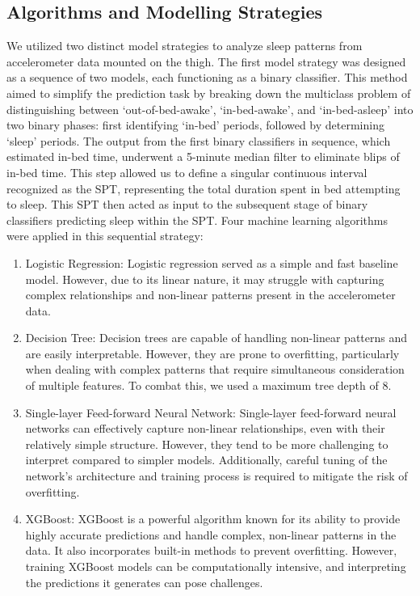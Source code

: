 \documentclass[
  10pt,
]{scrbook}
\begin{document}
\hypertarget{algorithms-and-modelling-strategies}{%
\subsection{Algorithms and Modelling
Strategies}\label{algorithms-and-modelling-strategies}}

We utilized two distinct model strategies to analyze sleep patterns from
accelerometer data mounted on the thigh. The first model strategy was
designed as a sequence of two models, each functioning as a binary
classifier. This method aimed to simplify the prediction task by
breaking down the multiclass problem of distinguishing between
`out-of-bed-awake', `in-bed-awake', and `in-bed-asleep' into two binary
phases: first identifying `in-bed' periods, followed by determining
`sleep' periods. The output from the first binary classifiers in
sequence, which estimated in-bed time, underwent a 5-minute median
filter to eliminate blips of in-bed time. This step allowed us to define
a singular continuous interval recognized as the SPT, representing the
total duration spent in bed attempting to sleep. This SPT then acted as
input to the subsequent stage of binary classifiers predicting sleep
within the SPT. Four machine learning algorithms were applied in this
sequential strategy:

\begin{enumerate}
\def\labelenumi{\arabic{enumi}.}
\item
  Logistic Regression: Logistic regression served as a simple and fast
  baseline model. However, due to its linear nature, it may struggle
  with capturing complex relationships and non-linear patterns present
  in the accelerometer data.
\item
  Decision Tree: Decision trees are capable of handling non-linear
  patterns and are easily interpretable. However, they are prone to
  overfitting, particularly when dealing with complex patterns that
  require simultaneous consideration of multiple features. To combat
  this, we used a maximum tree depth of 8.
\item
  Single-layer Feed-forward Neural Network: Single-layer feed-forward
  neural networks can effectively capture non-linear relationships, even
  with their relatively simple structure. However, they tend to be more
  challenging to interpret compared to simpler models. Additionally,
  careful tuning of the network's architecture and training process is
  required to mitigate the risk of overfitting.
\item
  XGBoost: XGBoost is a powerful algorithm known for its ability to
  provide highly accurate predictions and handle complex, non-linear
  patterns in the data. It also incorporates built-in methods to prevent
  overfitting. However, training XGBoost models can be computationally
  intensive, and interpreting the predictions it generates can pose
  challenges.
\end{enumerate}
\end{document}
